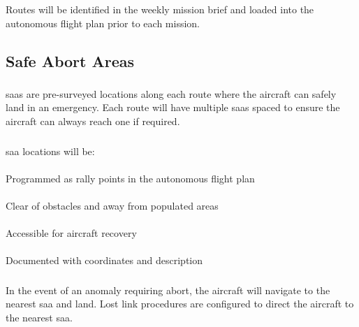         \subsubsection{} Routes will be identified in the weekly mission brief and loaded into the autonomous flight plan prior to each mission.

    \subsection{Safe Abort Areas}\label{ssec:safeabortareas}

        \subsubsection{} \acp{saa} are pre-surveyed locations along each route where the aircraft can safely land in an emergency. Each route will have multiple \acp{saa} spaced to ensure the aircraft can always reach one if required.

        \subsubsection{} \ac{saa} locations will be:

            \paragraph{} Programmed as rally points in the autonomous flight plan
            \paragraph{} Clear of obstacles and away from populated areas
            \paragraph{} Accessible for aircraft recovery
            \paragraph{} Documented with coordinates and description

        \subsubsection{} In the event of an anomaly requiring abort, the aircraft will navigate to the nearest \ac{saa} and land. Lost link procedures are configured to direct the aircraft to the nearest \ac{saa}.

